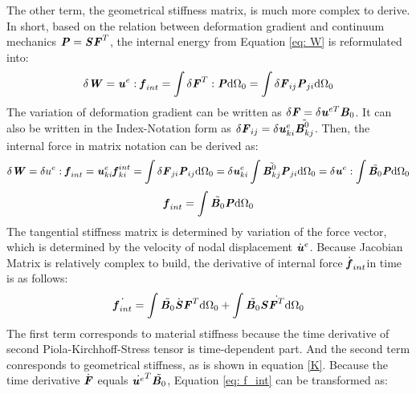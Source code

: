 The other term, the geometrical stiffness matrix, is much more complex to derive. In short, based on the relation between deformation gradient and continuum mechanics $\textbf{\textit{P}} = \textbf{\textit{S}}\textbf{\textit{F}}^T$, the internal energy from Equation \ref{eq: W} is reformulated into:  
\begin{equation}
\delta \textbf{\textit{W}} = \textbf{\textit{u}}^e : \textbf{\textit{f}}_{int} = \int \delta \textbf{\textit{F}}^T : \textbf{\textit{P}} \mathrm{d}\Omega_0 = \int \delta \textbf{\textit{F}}_{ij} \textbf{\textit{P}}_{ji} \mathrm{d}\Omega_0
\end{equation}
The variation of deformation gradient can be written as $\delta \textbf{\textit{F}} = \delta \textbf{\textit{u}}^{eT} \textbf{\textit{B}}_0$. It can also be written in the Index-Notation form as $\delta \textbf{\textit{F}}_{ij} = \delta \textbf{\textit{u}}_{ki}^e \tilde{\textbf{\textit{B}}_{kj}^0}$. Then, the internal force in matrix notation can be derived as:
\begin{equation}
\delta \textbf{\textit{W}} = \delta u^e : \textbf{\textit{f}}_{int} = \textbf{\textit{u}}_{ki}^e \textbf{\textit{f}}_{ki}^{int} = \int \delta \textbf{\textit{F}}_{ji} \textbf{\textit{P}}_{ij} \mathrm{d}\Omega_0 = \delta \textbf{\textit{u}}_{ki}^e \int \tilde{\textbf{\textit{B}}_{kj}^0} \textbf{\textit{P}}_{ji}\mathrm{d}\Omega_0 = \delta \textbf{\textit{u}}^e : \int \tilde{\textbf{\textit{B}}_0} \textbf{\textit{P}} \mathrm{d}\Omega_0
\end{equation}
\begin{equation}
\textbf{\textit{f}}_{int} = \int \tilde{\textbf{\textit{B}}_0} \textbf{\textit{P}} \mathrm{d}\Omega_0
\end{equation}
The tangential stiffness matrix is determined by variation of the force vector, which is determined by the velocity of nodal displacement $\dot{\textbf{\textit{u}}}^e$. Because Jacobian Matrix is relatively complex to build, the derivative of internal force $\dot{\textbf{\textit{f}}}_{int}$in time is as follows:
\begin{equation} \label{eq: f_int}
\dot{\textbf{\textit{f}}_{int}} = \int \tilde{\textbf{\textit{B}}_0} \dot{\textbf{\textit{S}}} \textbf{\textit{F}}^T \mathrm{d}\Omega_0 + \int \tilde{\textbf{\textit{B}}_0} \textbf{\textit{S}} \dot{\textbf{\textit{F}}^T} \mathrm{d}\Omega_0
\end{equation}
The first term corresponds to material stiffness because the time derivative of second Piola-Kirchhoff-Stress tensor is time-dependent part. And the second term conresponds to geometrical stiffness, as is shown in equation \ref{K}. Because the time derivative $\dot {\textbf{\textit{F}}}$ equals $\dot{\textbf{\textit{u}}^e}^T \tilde{\textbf{\textit{B}}_0}$, Equation \ref{eq: f_int} can be transformed as:
